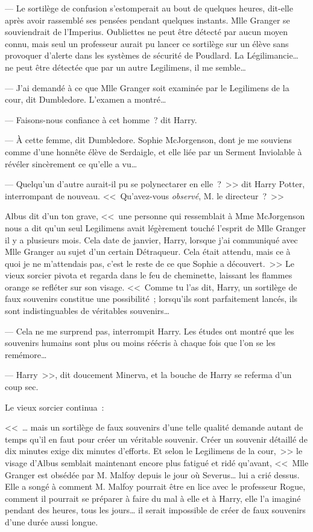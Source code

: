 --- Le sortilège de confusion s'estomperait au bout de quelques heures, dit-elle après avoir rassemblé ses pensées pendant quelques instants. Mlle Granger se souviendrait de l'Imperius. Oubliettes ne peut être détecté par aucun moyen connu, mais seul un professeur aurait pu lancer ce sortilège sur un élève sans provoquer d'alerte dans les systèmes de sécurité de Poudlard. La Légilimancie… ne peut être détectée que par un autre Legilimens, il me semble…

--- J'ai demandé à ce que Mlle Granger soit examinée par le Legilimens de la cour, dit Dumbledore. L'examen a montré…

--- Faisons-nous confiance à cet homme~? dit Harry.

--- À cette femme, dit Dumbledore. Sophie McJorgenson, dont je me souviens comme d'une honnête élève de Serdaigle, et elle liée par un Serment Inviolable à révéler sincèrement ce qu'elle a vu…

--- Quelqu'un d'autre aurait-il pu se polynectarer en elle~?~>> dit Harry Potter, interrompant de nouveau. <<~Qu'avez-vous \emph{observé}, M. le directeur~?~>>

Albus dit d'un ton grave, <<~une personne qui ressemblait à Mme McJorgenson nous a dit qu'un seul Legilimens avait légèrement touché l'esprit de Mlle Granger il y a plusieurs mois. Cela date de janvier, Harry, lorsque j'ai communiqué avec Mlle Granger au sujet d'un certain Détraqueur. Cela était attendu, mais ce à quoi je ne m'attendais pas, c'est le reste de ce que Sophie a découvert.~>> Le vieux sorcier pivota et regarda dans le feu de cheminette, laissant les flammes orange se refléter sur son visage. <<~Comme tu l'as dit, Harry, un sortilège de faux souvenirs constitue une possibilité~; lorsqu'ils sont parfaitement lancés, ils sont indistinguables de véritables souvenirs…

--- Cela ne me surprend pas, interrompit Harry. Les études ont montré que les souvenirs humains sont plus ou moins réécris à chaque fois que l'on se les remémore…

--- Harry~>>, dit doucement Minerva, et la bouche de Harry se referma d'un coup sec.

Le vieux sorcier continua~:

<<~… mais un sortilège de faux souvenirs d'une telle qualité demande autant de temps qu'il en faut pour créer un véritable souvenir. Créer un souvenir détaillé de dix minutes exige dix minutes d'efforts. Et selon le Legilimens de la cour,~>> le visage d'Albus semblait maintenant encore plus fatigué et ridé qu'avant, <<~Mlle Granger est obsédée par M. Malfoy depuis le jour où Severus… lui a crié dessus. Elle a songé à comment M. Malfoy pourrait être en lice avec le professeur Rogue, comment il pourrait se préparer à faire du mal à elle et à Harry, elle l'a imaginé pendant des heures, tous les jours… il serait impossible de créer de faux souvenirs d'une durée aussi longue.

